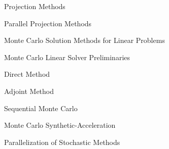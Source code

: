 \documentclass{beamer}
\begin{document}
\begin{frame}{Projection Methods}

\end{frame}

\begin{frame}{Parallel Projection Methods}

\end{frame}

\begin{frame}{Monte Carlo Solution Methods for Linear Problems}

\end{frame}

\begin{frame}{Monte Carlo Linear Solver Preliminaries}

\end{frame}

\begin{frame}{Direct Method}

\end{frame}

\begin{frame}{Adjoint Method}

\end{frame}

\begin{frame}{Sequential Monte Carlo}

\end{frame}

\begin{frame}{Monte Carlo Synthetic-Acceleration}

\end{frame}

\begin{frame}{Parallelization of Stochastic Methods}

\end{frame}
\end{document}
